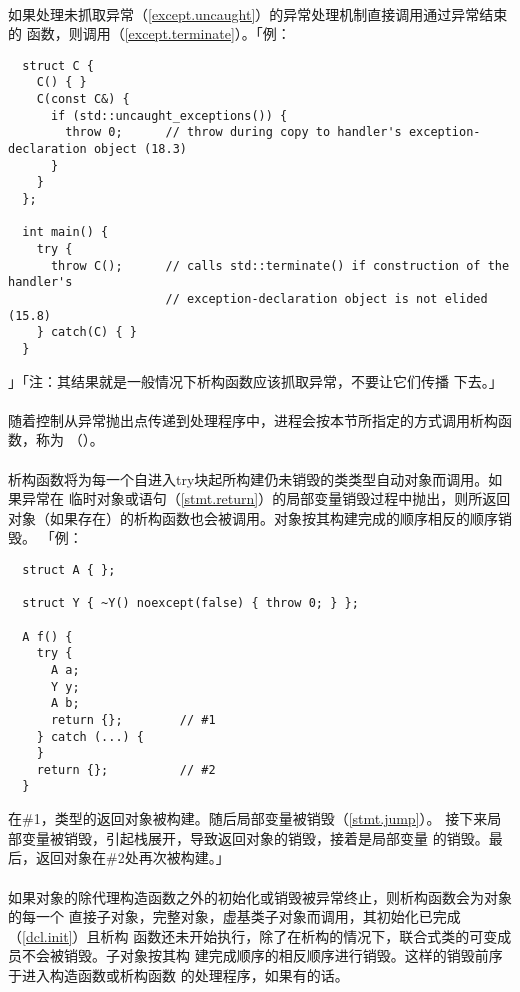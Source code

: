 \paragraph{}
如果处理未抓取异常（\ref{except.uncaught}）的异常处理机制直接调用通过异常结束的
函数，则调用（\ref{except.terminate}）。「例：
\begin{lstlisting}
  struct C {
    C() { }
    C(const C&) {
      if (std::uncaught_exceptions()) {
        throw 0;      // throw during copy to handler's exception-declaration object (18.3)
      }
    }
  };

  int main() {
    try {
      throw C();      // calls std::terminate() if construction of the handler's
                      // exception-declaration object is not elided (15.8)
    } catch(C) { }
  }
\end{lstlisting}」「注：其结果就是一般情况下析构函数应该抓取异常，不要让它们传播
下去。」

\paragraph{}
随着控制从异常抛出点传递到处理程序中，进程会按本节所指定的方式调用析构函数，称为
（）。

\paragraph{}
析构函数将为每一个自进入try块起所构建仍未销毁的类类型自动对象而调用。如果异常在
临时对象或语句（\ref{stmt.return}）的局部变量销毁过程中抛出，则所返回
对象（如果存在）的析构函数也会被调用。对象按其构建完成的顺序相反的顺序销毁。
「例：
\begin{lstlisting}
  struct A { };

  struct Y { ~Y() noexcept(false) { throw 0; } };

  A f() {
    try {
      A a;
      Y y;
      A b;
      return {};        // #1
    } catch (...) {
    }
    return {};          // #2
  }
\end{lstlisting}
在\#1，类型的返回对象被构建。随后局部变量被销毁（\ref{stmt.jump}）。
接下来局部变量被销毁，引起栈展开，导致返回对象的销毁，接着是局部变量
的销毁。最后，返回对象在\#2处再次被构建。」

\paragraph{}
如果对象的除代理构造函数之外的初始化或销毁被异常终止，则析构函数会为对象的每一个
直接子对象，完整对象，虚基类子对象而调用，其初始化已完成（\ref{dcl.init}）且析构
函数还未开始执行，除了在析构的情况下，联合式类的可变成员不会被销毁。子对象按其构
建完成顺序的相反顺序进行销毁。这样的销毁前序于进入构造函数或析构函数
的处理程序，如果有的话。


